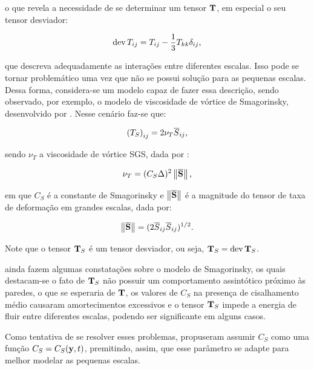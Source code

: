 \noindent o que revela a necessidade de se determinar um tensor $\mathbf{T}$, em especial o seu tensor desviador:

\begin{equation}
    \mathop{\mathrm{dev}}\nolimits{T_{ij}}=T_{ij}-\frac{1}{3}T_{kk}\delta_{ij}\text{,}
\end{equation}

\noindent que descreva adequadamente as interações entre diferentes escalas. Isso pode se tornar problemático uma vez que não se possui solução para as pequenas escalas. Dessa forma, considera-se um modelo capaz de fazer essa descrição, sendo observado, por exemplo, o modelo de viscosidade de vórtice de Smagorinsky, desenvolvido por . Nesse cenário faz-se que:

\begin{equation}
    \left({T_S}\right)_{ij}=2\nu_T\overline{S}_{ij}\text{,}
\end{equation}

\noindent sendo $\nu_T$ a viscosidade de vórtice SGS, dada por \cite{germano1991dynamic,piomelli1999large,hughes2000large}:

\begin{equation}
    \nu_T=(C_S\Delta)^2\left\lVert{\overline{\mathbf{S}}}\right\lVert\text{,}
\end{equation}

\noindent em que $C_S$ é a constante de Smagorinsky e $\left\lVert{\overline{\mathbf{S}}}\right\lVert$ é a magnitude do tensor de taxa de deformação em grandes escalas, dada por:

\begin{equation}
    \left\lVert{\overline{\mathbf{S}}}\right\lVert=(2\overline{S}_{ij}\overline{S}_{ij})^{1/2}\text{.}
\end{equation}

Note que o tensor $\mathbf{T}_S$ é um tensor desviador, ou seja, $\mathbf{T}_S=\mathop{\mathrm{dev}}\nolimits{\mathbf{T}_S}$.

 ainda fazem algumas constatações sobre o modelo de Smagorinsky, os quais destacam-se o fato de $\mathbf{T}_S$ não possuir um comportamento assintótico próximo às paredes, o que se esperaria de $\mathbf{T}$, os valores de $C_S$ na presença de cisalhamento médio causaram amortecimentos excessivos e o tensor $\mathbf{T}_S$ impede a energia de fluir entre diferentes escalas, podendo ser significante em alguns casos.

Como tentativa de se resolver esses problemas,  propuseram assumir $C_S$ como uma função $C_S=C_S(\mathbf{y},t)$, premitindo, assim, que esse parâmetro se adapte para melhor modelar as pequenas escalas.

